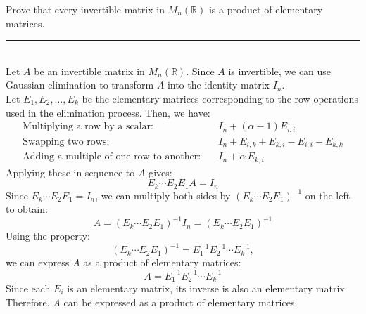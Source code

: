\documentclass[a4paper, 9pt]{extarticle}
\begin{document}
\begin{examplebox}{}{}
  Prove that every invertible matrix in $M_n(\mathbb{R})$ is a product of elementary matrices.
  \\ \rule{\textwidth}{1px} \\
  Let $A$  be an invertible matrix in $M_n(\mathbb{R})$. Since $A$ is invertible, we can use Gaussian elimination to transform $A$ into the identity matrix $I_n$. \\[2ex]
  Let $E_1, E_2, \ldots, E_k$ be the elementary matrices corresponding to the row operations used in the elimination process. Then, we have:
  \begin{align*}
    \text{Multiplying a row by a scalar:}           & \quad I_n + (\alpha - 1)E_{i,i}                   \\
    \text{Swapping two rows:}                       & \quad I_n + E_{i,k} + E_{k,i} - E_{i,i} - E_{k,k} \\
    \text{Adding a multiple of one row to another:} & \quad I_n + \alpha\,E_{k,i}
  \end{align*}
  Applying these in sequence to $A$ gives:
  $$E_k \cdots E_2 E_1 A = I_n$$
  Since $E_k \cdots E_2 E_1 = I_n$, we can multiply both sides by $(E_k \cdots E_2 E_1)^{-1}$ on the left to obtain:
  $$A = (E_k \cdots E_2 E_1)^{-1} I_n = (E_k \cdots E_2 E_1)^{-1}$$
  Using the property:
  $$(E_k \cdots E_2 E_1)^{-1} = E_1^{-1} E_2^{-1} \cdots E_k^{-1},$$
  we can express $A$ as a product of elementary matrices:
  $$A = E_1^{-1} E_2^{-1} \cdots E_k^{-1}$$
  Since each $E_i$ is an elementary matrix, its inverse is also an elementary matrix. Therefore, $A$ can be expressed as a product of elementary matrices.
\end{examplebox}
\pagebreak
\end{document}
